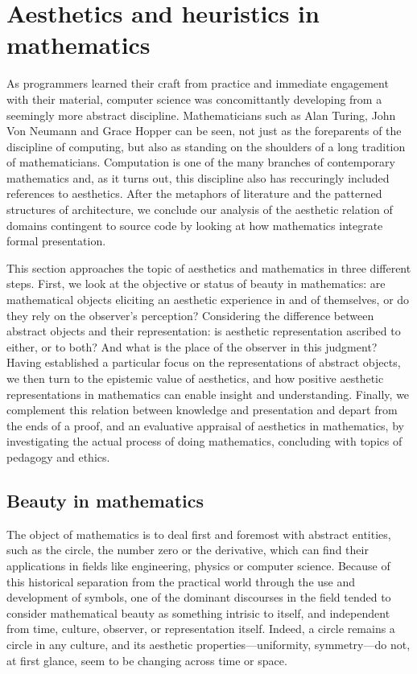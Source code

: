 \section{Aesthetics and heuristics in mathematics}
\label{sec:aesthetic-scientific}

As programmers learned their craft from practice and immediate engagement with their material, computer science was concomittantly developing from a seemingly more abstract discipline. Mathematicians such as Alan Turing, John Von Neumann and Grace Hopper can be seen, not just as the foreparents of the discipline of computing, but also as standing on the shoulders of a long tradition of mathematicians. Computation is one of the many branches of contemporary mathematics and, as it turns out, this discipline also has reccuringly included references to aesthetics. After the metaphors of literature and the patterned structures of architecture, we conclude our analysis of the aesthetic relation of domains contingent to source code by looking at how mathematics integrate formal presentation.

This section approaches the topic of aesthetics and mathematics in three different steps. First, we look at the objective or status of beauty in mathematics: are mathematical objects eliciting an aesthetic experience in and of themselves, or do they rely on the observer's perception? Considering the difference between abstract objects and their representation: is aesthetic representation ascribed to either, or to both? And what is the place of the observer in this judgment? Having  established a particular focus on the representations of abstract objects, we then turn to the epistemic value of aesthetics, and how positive aesthetic representations in mathematics can enable insight and understanding. Finally, we complement this relation between knowledge and presentation and depart from the ends of a proof, and an evaluative appraisal of aesthetics in mathematics, by investigating the actual process of doing mathematics, concluding with topics of pedagogy and ethics.

\subsection{Beauty in mathematics}
\label{subsec:beauty-mathematics}

The object of mathematics is to deal first and foremost with abstract entities, such as the circle, the number zero or the derivative, which can find their applications in fields like engineering, physics or computer science. Because of this historical separation from the practical world through the use and development of symbols, one of the dominant discourses in the field tended to consider mathematical beauty as something intrisic to itself, and independent from time, culture, observer, or representation itself. Indeed, a circle remains a circle in any culture, and its aesthetic properties—uniformity, symmetry—do not, at first glance, seem to be changing across time or space.


